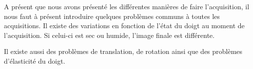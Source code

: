 A présent que nous avons présenté les différentes manières de faire
l'acquisition, il nous faut à présent introduire quelques problèmes
communs à toutes les acquisitions. Il existe des variations en
fonction de l'état du doigt au moment de l'acquisition. Si celui-ci
est sec ou humide, l'image finale est différente.

Il existe aussi des problèmes de translation, de rotation ainsi que
des problèmes d'élasticité du doigt.


